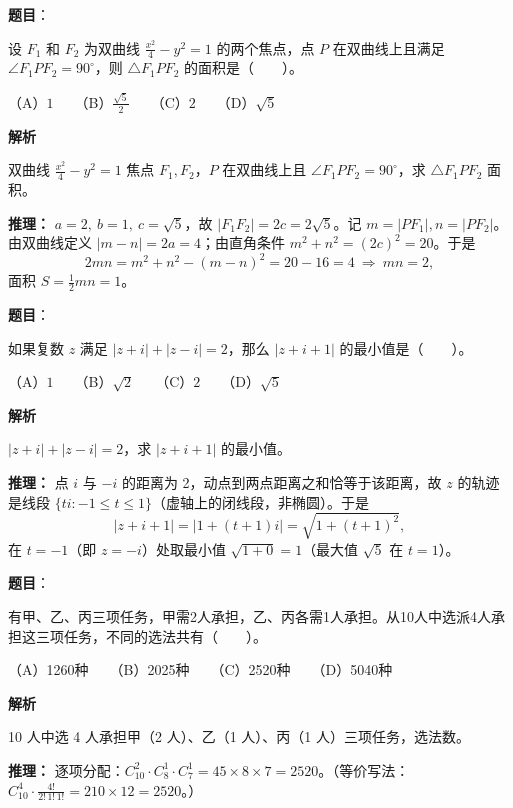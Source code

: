 \begin{answer}

\textbf{题目}：

设 $F_1$ 和 $F_2$ 为双曲线 $\frac{x^2}{4}-y^2=1$ 的两个焦点，点 $P$ 在双曲线上且满足 $\angle F_1PF_2=90^\circ$，则 $\triangle F_1PF_2$ 的面积是\mbox{（　　）}。

（A）$1$　　（B）$\frac{\sqrt5}{2}$　　（C）$2$　　（D）$\sqrt5$

\textbf{解析}

双曲线 $\frac{x^2}4-y^2=1$ 焦点 $F_1,F_2$，$P$ 在双曲线上且 $\angle F_1PF_2=90^\circ$，求 $\triangle F_1PF_2$ 面积。

\textbf{推理：} $a=2,\ b=1,\ c=\sqrt5$，故 $|F_1F_2|=2c=2\sqrt5$。记 $m=|PF_1|,n=|PF_2|$。由双曲线定义 $|m-n|=2a=4$；由直角条件 $m^2+n^2=(2c)^2=20$。于是
\nopagebreak[4]
\[2mn=m^2+n^2-(m-n)^2=20-16=4\ \Rightarrow\ mn=2,\]
面积 $S=\frac12mn=1$。


\end{answer}
\begin{answer}

\textbf{题目}：

如果复数 $z$ 满足 $|z+i|+|z-i|=2$，那么 $|z+i+1|$ 的最小值是\mbox{（　　）}。

（A）$1$　　（B）$\sqrt2$　　（C）$2$　　（D）$\sqrt5$

\textbf{解析}

$|z+i|+|z-i|=2$，求 $|z+i+1|$ 的最小值。

\textbf{推理：} 点 $i$ 与 $-i$ 的距离为 2，动点到两点距离之和恰等于该距离，故 $z$ 的轨迹是线段 $\{ti:-1\le t\le1\}$（虚轴上的闭线段，非椭圆）。于是
\nopagebreak[4]
\[|z+i+1|=|1+(t+1)i|=\sqrt{1+(t+1)^2},\]
在 $t=-1$（即 $z=-i$）处取最小值 $\sqrt{1+0}=1$（最大值 $\sqrt5$ 在 $t=1$）。


\end{answer}
\begin{answer}

\textbf{题目}：

有甲、乙、丙三项任务，甲需2人承担，乙、丙各需1人承担。从10人中选派4人承担这三项任务，不同的选法共有\mbox{（　　）}。

（A）1260种　　（B）2025种　　（C）2520种　　（D）5040种

\textbf{解析}

10 人中选 4 人承担甲（2 人）、乙（1 人）、丙（1 人）三项任务，选法数。

\textbf{推理：} 逐项分配：$C_{10}^2\cdot C_8^1\cdot C_7^1=45\times8\times7=2520$。（等价写法：$C_{10}^4\cdot\frac{4!}{2!\,1!\,1!}=210\times12=2520$。）


\end{answer}
